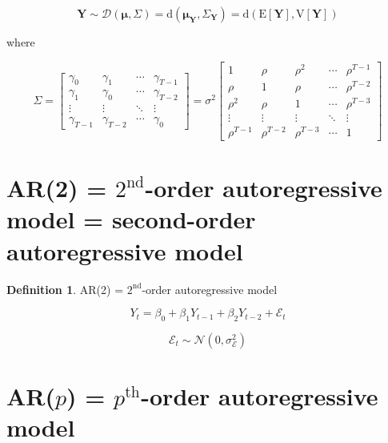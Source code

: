 \documentclass[
]{book}
\theoremstyle{definition}
\newtheorem{definition}{Definition}[chapter]
\theoremstyle{definition}
\theoremstyle{definition}
\theoremstyle{definition}
\theoremstyle{remark}
\begin{document}
\[
\boldsymbol{Y}\sim\mathcal{D}\left(\boldsymbol{\mu},\mathit{\Sigma}\right)=\mathrm{d}\left(\boldsymbol{\mu}_{\boldsymbol{Y}},\mathit{\Sigma}_{\boldsymbol{Y}}\right)=\mathrm{d}\left(\mathrm{E}\left[\boldsymbol{Y}\right],\mathrm{V}\left[\boldsymbol{Y}\right]\right)
\]

where

\[
\mathit{\Sigma}=\begin{bmatrix}\gamma_{0} & \gamma_{1} & \cdots & \gamma_{T-1}\\
\gamma_{1} & \gamma_{0} & \cdots & \gamma_{T-2}\\
\vdots & \vdots & \ddots & \vdots\\
\gamma_{T-1} & \gamma_{T-2} & \cdots & \gamma_{0}
\end{bmatrix}=\sigma^{2}\begin{bmatrix}1 & \rho & \rho^{2} & \cdots & \rho^{T-1}\\
\rho & 1 & \rho & \cdots & \rho^{T-2}\\
\rho^{2} & \rho & 1 & \cdots & \rho^{T-3}\\
\vdots & \vdots & \vdots & \ddots & \vdots\\
\rho^{T-1} & \rho^{T-2} & \rho^{T-3} & \cdots & 1
\end{bmatrix}
\]

\section{\texorpdfstring{AR(2) = \(2^\text{nd}\)-order autoregressive model = second-order autoregressive model}{AR(2) = 2\^{}\textbackslash text\{nd\}-order autoregressive model = second-order autoregressive model}}\label{ar2-2textnd-order-autoregressive-model-second-order-autoregressive-model}

\begin{definition}
\protect\hypertarget{def:unnamed-chunk-6}{}\label{def:unnamed-chunk-6}AR(2) = \(2^\text{nd}\)-order autoregressive model
\end{definition}

\[
Y_{t}=\beta_{0}+\beta_{1}Y_{t-1}+\beta_{2}Y_{t-2}+\mathcal{E}_{t}
\]

\[
\mathcal{E}_{t}\sim\mathcal{N}\left(0,\sigma_{\mathcal{E}}^{2}\right)
\]

\section{\texorpdfstring{AR(\(p\)) = \(p^\text{th}\)-order autoregressive model}{AR(p) = p\^{}\textbackslash text\{th\}-order autoregressive model}}\label{arp-ptextth-order-autoregressive-model}
\end{document}
